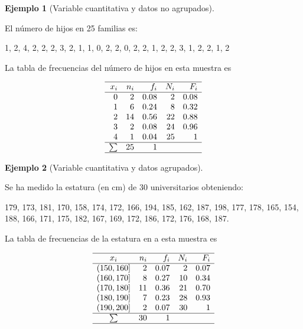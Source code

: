 \documentclass[
  spanish,
  a4paper,
]{scrreport}
\theoremstyle{plain}
\theoremstyle{definition}
\newtheorem{example}{Ejemplo}[chapter]
\theoremstyle{definition}
\theoremstyle{remark}
\begin{document}
\begin{example}[Variable cuantitativa y datos no
agrupados]\protect\hypertarget{exm-tabla-frecuencias-datos-no-agrupados}{}\label{exm-tabla-frecuencias-datos-no-agrupados}

El número de hijos en 25 familias es:

1, 2, 4, 2, 2, 2, 3, 2, 1, 1, 0, 2, 2, 0, 2, 2, 1, 2, 2, 3, 1, 2, 2, 1,
2

La tabla de frecuencias del número de hijos en esta muestra es

\[ 
\begin{array}{rrrrr}
\hline
x_i & n_i & f_i & N_i & F_i\\
\hline
0 & 2 & 0.08 & 2 & 0.08\\
1 & 6 & 0.24 & 8 & 0.32\\
2 & 14 & 0.56 & 22 & 0.88\\
3 & 2 & 0.08 & 24 & 0.96\\
4 & 1 & 0.04 & 25 & 1 \\
\hline
\sum & 25 & 1 \\
\hline
\end{array}
\]

\end{example}

\begin{example}[Variable cuantitativa y datos
agrupados]\protect\hypertarget{exm-tabla-frecuencias-datos-agrupados}{}\label{exm-tabla-frecuencias-datos-agrupados}

Se ha medido la estatura (en cm) de 30 universitarios obteniendo:

179, 173, 181, 170, 158, 174, 172, 166, 194, 185, 162, 187, 198, 177,
178, 165, 154, 188, 166, 171, 175, 182, 167, 169, 172, 186, 172, 176,
168, 187.

La tabla de frecuencias de la estatura en a esta muestra es

\[ 
\begin{array}{crrrr}
\hline
x_i & n_i & f_i & N_i & F_i\\
\hline
(150,160] & 2 & 0.07 & 2 & 0.07\\
(160,170] & 8 & 0.27 & 10 & 0.34\\
(170,180] & 11 & 0.36 & 21 & 0.70\\
(180,190] & 7 & 0.23 & 28 & 0.93\\
(190,200] & 2 & 0.07 & 30 & 1 \\
\hline
\sum & 30 & 1 \\
\hline
\end{array}
\]

\end{example}
\end{document}

